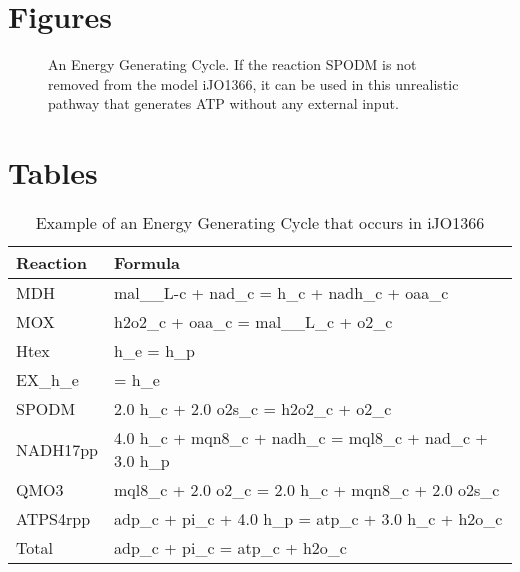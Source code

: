 \documentclass[twocolumn]{article}
\begin{document}

\section*{Figures}
  \begin{figure}[h!]
  \label{fig:egc_example}
  \caption{An Energy Generating Cycle.
      If the reaction SPODM is not removed from the model iJO1366, it can
      be used in this unrealistic pathway that generates ATP without any
      external input.}
      \end{figure}

\section*{Tables}

\begin{table}[h!]
\caption{Example of an Energy Generating Cycle that occurs in iJO1366}
\begin{tabular}{l|l}
\label{table:egc_example}
Reaction & Formula\\\hline
MDH & mal\_\_L-c + nad\_c = h\_c + nadh\_c + oaa\_c\\
MOX	& h2o2\_c + oaa\_c = mal\_\_L\_c + o2\_c\\
Htex	& h\_e = h\_p\\
EX\_h\_e & = h\_e\\
SPODM & 2.0 h\_c + 2.0 o2s\_c = h2o2\_c + o2\_c\\
NADH17pp & 4.0 h\_c + mqn8\_c + nadh\_c = mql8\_c + nad\_c + 3.0 h\_p\\
QMO3 & mql8\_c + 2.0 o2\_c = 2.0 h\_c + mqn8\_c + 2.0 o2s\_c\\
ATPS4rpp & adp\_c + pi\_c + 4.0 h\_p = atp\_c + 3.0 h\_c + h2o\_c\\\hline
Total & adp\_c + pi\_c = atp\_c + h2o\_c
\end{tabular}
\end{table}
\end{document}
